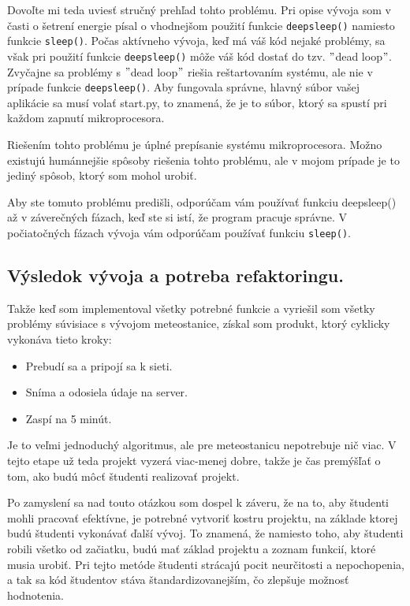 Dovoľte mi teda uviesť stručný prehľad tohto problému. Pri opise vývoja som v časti o šetrení energie písal o vhodnejšom použití funkcie \verb|deepsleep()| namiesto funkcie \verb|sleep()|. Počas aktívneho vývoja, keď má váš kód nejaké problémy, sa však pri použití funkcie \verb|deepsleep()| môže váš kód dostať do tzv. $"$dead loop$"$. Zvyčajne sa problémy s $"$dead loop$"$ riešia reštartovaním systému, ale nie v prípade funkcie \verb|deepsleep()|. Aby fungovala správne, hlavný súbor vašej aplikácie sa musí volať start.py, to znamená, že je to súbor, ktorý sa spustí pri každom zapnutí mikroprocesora. 

Riešením tohto problému je úplné prepísanie systému mikroprocesora. Možno existujú humánnejšie spôsoby riešenia tohto problému, ale v mojom prípade je to jediný spôsob, ktorý som mohol urobiť. 

Aby ste tomuto problému predišli, odporúčam vám používať funkciu deepsleep() až v záverečných fázach, keď ste si istí, že program pracuje správne. V počiatočných fázach vývoja vám odporúčam používať funkciu \verb|sleep()|.

\subsection{Výsledok vývoja a potreba refaktoringu.}
Takže keď som implementoval všetky potrebné funkcie a vyriešil som všetky problémy súvisiace s vývojom meteostanice, získal som produkt, ktorý cyklicky vykonáva tieto kroky:
\begin{itemize}
    \item Prebudí sa a pripojí sa k sieti.
    \item Sníma a odosiela údaje na server. 
    \item Zaspí na 5 minút.
\end{itemize}

Je to veľmi jednoduchý algoritmus, ale pre meteostanicu nepotrebuje nič viac. V tejto etape už teda projekt vyzerá viac-menej dobre, takže je čas premýšľať o tom, ako budú môcť študenti realizovať projekt.

Po zamyslení sa nad touto otázkou som dospel k záveru, že na to, aby študenti mohli pracovať efektívne, je potrebné vytvoriť kostru projektu, na základe ktorej budú študenti vykonávať ďalší vývoj. To znamená, že namiesto toho, aby študenti robili všetko od začiatku, budú mať základ projektu a zoznam funkcií, ktoré musia urobiť. Pri tejto metóde študenti strácajú pocit neurčitosti a nepochopenia, a tak sa kód študentov stáva štandardizovanejším, čo zlepšuje možnosť hodnotenia. 

